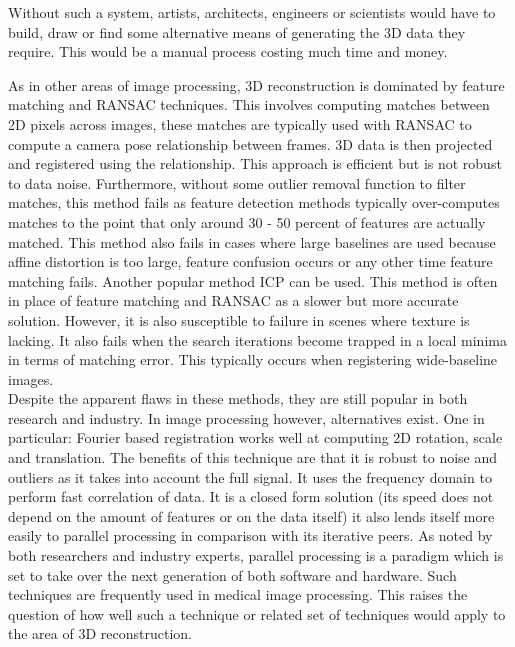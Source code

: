 Without such a system, artists, architects, engineers or scientists would have to build, draw or find some alternative means of generating the 3D data they require. This would be a manual process costing much time and money.

As in other areas of image processing, 3D reconstruction is dominated by feature matching and RANSAC techniques. This involves computing matches between 2D pixels across images, these matches are typically used with RANSAC to compute a camera pose relationship between frames. 3D data is then projected and registered using the relationship. This approach is efficient but is not robust to data noise. Furthermore, without some outlier removal function to filter matches, this method fails as feature detection methods typically over-computes matches to the point that only around 30 - 50 percent of features are actually matched. This method also fails in cases where large baselines are used because affine distortion is too large, feature confusion occurs or any other time feature matching fails. Another popular method ICP can be used. This method is often in place of feature matching and RANSAC as a slower but more accurate solution. However, it is also susceptible to failure in scenes where texture is lacking. It also fails when the search iterations become trapped in a local minima in terms of matching error. This typically occurs when registering wide-baseline images. \\

Despite the apparent flaws in these methods, they are still popular in both research and industry. In image processing however, alternatives exist. One in particular: Fourier based registration works well at computing 2D rotation, scale and translation. The benefits of this technique are that it is robust to noise and outliers as it takes into account the full signal. It uses the frequency domain to perform fast correlation of data. It is a closed form solution (its speed does not depend on the amount of features or on the data itself) it also lends itself more easily to parallel processing in comparison with its iterative peers. As noted by both researchers and industry experts, parallel processing is a paradigm which is set to take over the next generation of both software and hardware. Such techniques are frequently used in medical image processing. This raises the question of how well such a technique or related set of techniques would apply to the area of 3D reconstruction. \\

